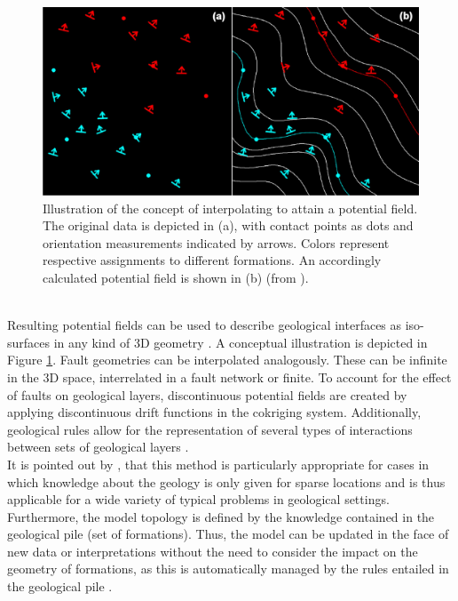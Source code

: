 		\begin{figure}[h]
			\centering
			\includegraphics[width=1\textwidth]{Figures/calcagno_pot_field.png}
			\caption{Illustration of the concept of interpolating to attain a potential field. The original data is depicted in (a), with contact points as dots and orientation measurements indicated by arrows. Colors represent respective assignments to different formations. An accordingly calculated potential field is shown in (b) (from \citet{calcagno2008geological}).}\label{fig:pot_field}
		\end{figure}\\
        Resulting potential fields can be used to describe geological interfaces as iso-surfaces in any kind of 3D geometry \citep{calcagno2008geological}. A conceptual illustration is depicted in Figure \ref{fig:pot_field}. Fault geometries can be interpolated analogously. These can be infinite in the 3D space, interrelated in a fault network or finite. To account for the effect of faults on geological layers, discontinuous potential fields are created by applying discontinuous drift functions in the cokriging system. Additionally, geological rules allow for the representation of several types of interactions between sets of geological layers \citep{calcagno2008geological}.\\
        It is pointed out by \citet{calcagno2008geological}, that this method is particularly appropriate for cases in which knowledge about the geology is only given for sparse locations and is thus applicable for a wide variety of typical problems in geological settings. Furthermore, the model topology is defined by the knowledge contained in the geological pile (set of formations). Thus, the model can be updated in the face of new data or interpretations without the need to consider the impact on the geometry of formations, as this is automatically managed by the rules entailed in the geological pile \citep{calcagno2008geological}. 
     
